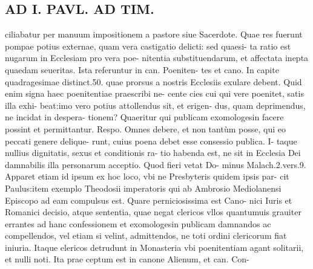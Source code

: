 \documentclass{article}
\begin{document}
\begin{pages}
\section*{AD I. PAVL. AD TIM. }
\marginpar{[ p.324 ]}\pstart ciliabatur per manuum impositionem a pastore siue Sacerdote. Quae res fuerunt pompae potius externae, quam vera castigatio delicti: sed quaesi- ta ratio est nugarum in Ecclesiam pro vera poe- nitentia substituendarum, et affectata inepta quaedam seueritas. Ista referuntur in can. Poeniten- tes et cano. In capite quadragesimae distinct.50. quae prorsus a nostris Ecclesiis exulare debent. Quid enim signa haec poenitentiae praescribi ne- cente cies cui qui vere poenitet, satis illa exhi- beat:imo vero potius attollendus sit, et erigen- dus, quam deprimendus, ne incidat in despera- tionem?  \pend\pstart Quaeritur qui publicam exomologesin facere possint et permittantur. Respo. Omnes debere, et non tantùm posse, qui eo peccati genere delique- runt, cuius poena debet esse consessio publica. I- taque nullius dignitatis, sexus et conditionis ra- tio habenda est, ne sit in Ecclesia Dei damnabilis illa personarum acceptio. Quod fieri vetat Do- minus Malach.2.vers.9. Apparet etiam id ipsum ex hoc loco, vbi ne Presbyteris quidem ipsis par- cit Paulus:item exemplo Theodosii imperatoris qui ab Ambrosio Mediolanensi Episcopo ad eam compulsus est. Quare perniciosissima est Cano- nici Iuris et Romanici decisio, atque sententia, quae negat clericos vllos quantumuis grauiter errantes ad hanc confessionem et exomologesin publicam damnandos ac compellendos, vel etiam si velint, admittendos, ne toti ordini clericorum fiat iniuria. Itaque  elericos detrudunt in Monasteria vbi poenitentiam agant solitarii, et nulli noti. Ita prae ceptum est in canone Alienum, et can. Con-  \pend

\end{pages}
\end{document}
